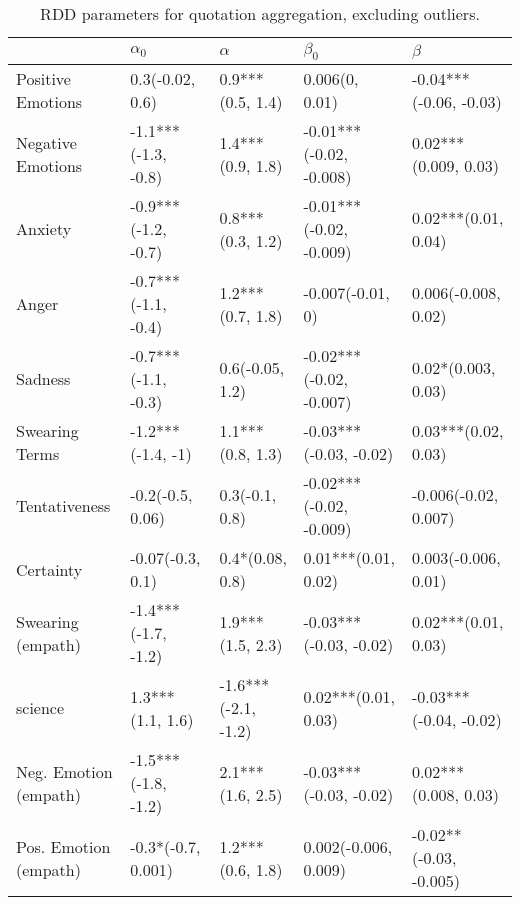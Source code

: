 \begin{table}[h]\centering
\begin{adjustbox}{width=\linewidth, center}
	\begin{tabular}{lllll}
	\toprule
	{} &           $\alpha_0$ &             $\alpha$ &                $\beta_0$ &                 $\beta$ \\
	\midrule
	Positive Emotions     &      0.3(-0.02, 0.6) &     0.9***(0.5, 1.4) &           0.006(0, 0.01) &  -0.04***(-0.06, -0.03) \\
	Negative Emotions     &  -1.1***(-1.3, -0.8) &     1.4***(0.9, 1.8) &  -0.01***(-0.02, -0.008) &    0.02***(0.009, 0.03) \\
	Anxiety               &  -0.9***(-1.2, -0.7) &     0.8***(0.3, 1.2) &  -0.01***(-0.02, -0.009) &     0.02***(0.01, 0.04) \\
	Anger                 &  -0.7***(-1.1, -0.4) &     1.2***(0.7, 1.8) &         -0.007(-0.01, 0) &     0.006(-0.008, 0.02) \\
	Sadness               &  -0.7***(-1.1, -0.3) &      0.6(-0.05, 1.2) &  -0.02***(-0.02, -0.007) &      0.02*(0.003, 0.03) \\
	Swearing Terms        &    -1.2***(-1.4, -1) &     1.1***(0.8, 1.3) &   -0.03***(-0.03, -0.02) &     0.03***(0.02, 0.03) \\
	Tentativeness         &     -0.2(-0.5, 0.06) &       0.3(-0.1, 0.8) &  -0.02***(-0.02, -0.009) &    -0.006(-0.02, 0.007) \\
	Certainty             &     -0.07(-0.3, 0.1) &      0.4*(0.08, 0.8) &      0.01***(0.01, 0.02) &     0.003(-0.006, 0.01) \\
	Swearing (empath)     &  -1.4***(-1.7, -1.2) &     1.9***(1.5, 2.3) &   -0.03***(-0.03, -0.02) &     0.02***(0.01, 0.03) \\
	science               &     1.3***(1.1, 1.6) &  -1.6***(-2.1, -1.2) &      0.02***(0.01, 0.03) &  -0.03***(-0.04, -0.02) \\
	Neg. Emotion (empath) &  -1.5***(-1.8, -1.2) &     2.1***(1.6, 2.5) &   -0.03***(-0.03, -0.02) &    0.02***(0.008, 0.03) \\
	Pos. Emotion (empath) &   -0.3*(-0.7, 0.001) &     1.2***(0.6, 1.8) &     0.002(-0.006, 0.009) &  -0.02**(-0.03, -0.005) \\
	\bottomrule
	\end{tabular}
	
\end{adjustbox}
	\caption{RDD parameters for quotation aggregation, excluding outliers.}
	\label{fig: Quotation_2}
\end{table}

